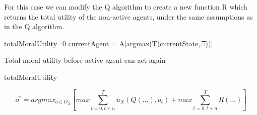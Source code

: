 \documentclass{article}
\begin{document}
For this case we can modify the Q algorithm to create a new function R which returns the total utility of the non-active agents, under the same assumptions as in the Q algorithm.
\newline

\begin{algorithm}[H]
\SetAlgoLined
totalMoralUtility=0\;
 currentAgent = A[argmax(T(currentState,$\Xi$))]\;
 \caption{Total moral utility before active agent can act again}
 \Return totalMoralUtility\;
\end{algorithm}
 
\[
o^*=argmax_{o \in O_X} \left[max \sum_{t=0, t+n}^T  u_X(Q(...),o_t) + max \sum_{t=0, t+n}^T R(...)\right]
\]
\end{document}
